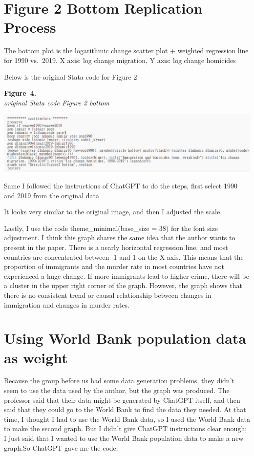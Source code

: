 \documentclass[
  jou,
  floatsintext,
  longtable,
  nolmodern,
  notxfonts,
  notimes,
  colorlinks=true,linkcolor=blue,citecolor=blue,urlcolor=blue]{apa7}
\begin{document}
\section{Figure 2 Bottom Replication
Process}\label{figure-2-bottom-replication-process}

The bottom plot is the logarithmic change scatter plot + weighted
regression line for 1990 vs.~2019. X axis: log change migration, Y axis:
log change homicides

Below is the original Stata code for Figure 2

\label{fig:statabottom}
\textbf{Figure~4.}\\
\emph{original Stata code Figure 2 bottom}

\begin{center}
\includegraphics[width=0.8\linewidth,height=\textheight,keepaspectratio]{fig/statabottom.png}
\end{center}

Same I followed the instructions of ChatGPT to do the steps, first
select 1990 and 2019 from the original data

It looks very similar to the original image, and then I adjusted the
scale.

Lastly, I use the code theme\_minimal(base\_size = 38) for the font size
adjustment. I think this graph shares the same idea that the author
wants to present in the paper. There is a nearly horizontal regression
line, and most countries are concentrated between -1 and 1 on the X
axis. This means that the proportion of immigrants and the murder rate
in most countries have not experienced a huge change. If more immigrants
lead to higher crime, there will be a cluster in the upper right corner
of the graph. However, the graph shows that there is no consistent trend
or causal relationship between changes in immigration and changes in
murder rates.

\section{Using World Bank population data as
weight}\label{using-world-bank-population-data-as-weight}

Because the group before us had some data generation problems, they
didn't seem to use the data used by the author, but the graph was
produced. The professor said that their data might be generated by
ChatGPT itself, and then said that they could go to the World Bank to
find the data they needed. At that time, I thought I had to use the
World Bank data, so I used the World Bank data to make the second graph.
But I didn't give ChatGPT instructions clear enough; I just said that I
wanted to use the World Bank population data to make a new graph.So
ChatGPT gave me the code:
\end{document}
